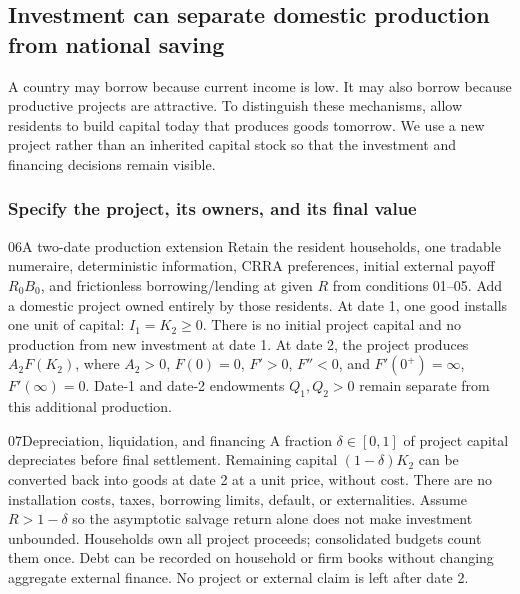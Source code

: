 \subsection{Investment can separate domestic production from national saving}

A country may borrow because current income is low. It may also borrow
because productive projects are attractive. To distinguish these mechanisms,
allow residents to build capital today that produces goods tomorrow. We use
a new project rather than an inherited capital stock so that the investment
and financing decisions remain visible.

\subsubsection{Specify the project, its owners, and its final value}

\begin{modelsetup}[1]
\begin{modelcondition}{06}{A two-date production extension}
Retain the resident households, one tradable numeraire, deterministic
information, CRRA preferences, initial external payoff $R_0B_0$, and frictionless
borrowing/lending at given $R$ from conditions 01--05. Add a domestic project
owned entirely by those residents. At date 1, one good installs one unit of
capital: $I_1=K_2\geq0$. There is no initial project capital and no production
from new investment at date 1. At date 2, the project produces $A_2F(K_2)$,
where $A_2>0$, $F(0)=0$, $F'>0$, $F''<0$, and
$F'(0^+)=\infty$, $F'(\infty)=0$. Date-1 and date-2 endowments $Q_1,Q_2>0$
remain separate from this additional production.
\end{modelcondition}
\end{modelsetup}

\begin{modelsetup}[1]
\begin{modelcondition}{07}{Depreciation, liquidation, and financing}
A fraction $\delta\in[0,1]$ of project capital depreciates before final
settlement. Remaining capital $(1-\delta)K_2$ can be converted back into goods
at date 2 at a unit price, without cost. There are no installation costs,
taxes, borrowing limits, default, or externalities. Assume $R>1-\delta$ so
the asymptotic salvage return alone does not make investment unbounded.
Households own all project proceeds; consolidated budgets count them once.
Debt can be recorded on household or firm books without changing aggregate
external finance. No project or external claim is left after date 2.
\end{modelcondition}
\end{modelsetup}

